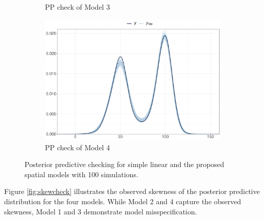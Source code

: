 \documentclass[a4paper]{article}   	%
\begin{document}
\begin{figure}[!htp]
\begin{subfigure}[t]{0.45\textwidth}
			\caption{PP check of Model 3}
		\end{subfigure}
		\begin{subfigure}[t]{0.45\textwidth}
			\includegraphics[width=\linewidth]{Images/ppcheck_STRand}
			\caption{PP check of Model 4}
		\end{subfigure}
		\caption{Posterior predictive checking for simple linear and the proposed spatial models with 100 simulations.}\label{fig:ppcheck}
	\end{figure}
	
	
	Figure \ref{fig:skewcheck} illustrates the observed skewness of the posterior predictive distribution for the four models. While Model 2 and 4 capture the observed skewness, Model 1 and 3 demonstrate model misspecification. 
	
\end{document}
